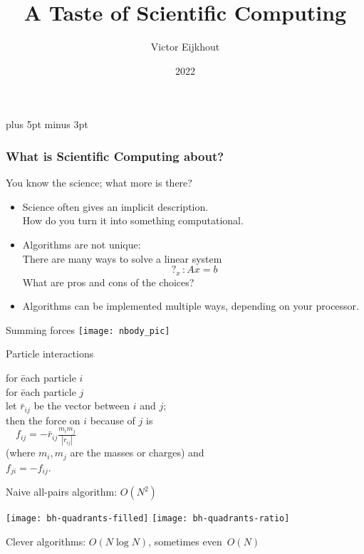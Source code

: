 \documentclass[11pt,headernav]{beamer}
\begin{document}
\parskip=10pt plus 5pt minus 3pt

\title{A Taste of Scientific Computing}
\author{Victor Eijkhout}
\date{2022}

\begin{frame}
  \titlepage
\end{frame}

\begin{frame}\frametitle{What is Scientific Computing about?}
  You know the science; what more is there?
  \begin{itemize}
  \item Science often gives an implicit description.\\
    How do you turn it into something computational.
  \item Algorithms are not unique:\\
    There are many ways to solve a linear system
    \[ \mathop{?}_x\colon Ax=b \]
    What are pros and cons of the choices?
  \item Algorithms can be implemented multiple ways, depending on your
    processor.
  \end{itemize}
\end{frame}


\begin{frame}{Summing forces}
  \texttt{[image: nbody\_pic]}
\end{frame}

\begin{frame}{Particle interactions}
  \begin{tabbing}
    for \=each particle $i$\\
    \>for \= each particle $j$\\
    \>\> let $\bar r_{ij}$ be the vector between $i$ and $j$;\\
    \>\> then the force on $i$ because of $j$ is\\
    \>\> $\quad f_{ij} = -\bar r_{ij}\frac{m_im_j}{|r_{ij}|}$\\
    \>\> (where $m_i,m_j$ are the masses or charges) and\\
    \>\> $f_{ji}=-f_{ij}$.
  \end{tabbing}
  Naive all-pairs algorithm: $O(N^2)$
\end{frame}

\begin{frame}
  \texttt{[image: bh-quadrants-filled]}
  \texttt{[image: bh-quadrants-ratio]}

  Clever algorithms: $O(N\log N)$, sometimes even~$O(N)$
\end{frame}
\end{document}

